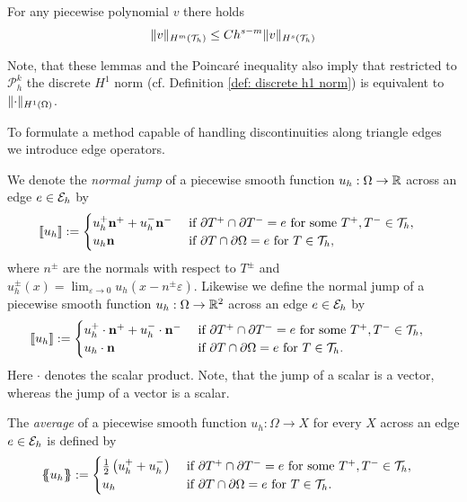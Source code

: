 \begin{definition} 
\begin{lemma}\label{la: inverse estimate}
	For any piecewise polynomial $v$ there holds
	\[
	\lVert v \rVert_{H^m(\mathcal{T}_h)} \leq C h^{s-m} \lVert v \rVert_{H^s(\mathcal{T}_h)}
	\]
\end{lemma}
Note, that these lemmas and the Poincar\'e inequality also imply that restricted to $\mathcal P^k_h$ the discrete $H^1$ norm (cf. Definition \ref{def: discrete h1 norm}) is equivalent to $\lVert \cdot \rVert_{H^1(\Omega)}$.

To formulate a method capable of handling discontinuities along triangle edges we introduce edge operators.   

\begin{definition} \label{def: edge operators}
We denote the \emph{normal jump} of  a piecewise smooth function $u_h:\Omega \rightarrow \mathbb{R}$ across an edge $e \in \mathcal{E}_h$ by
\begin{align*}
	\llbracket u_h \rrbracket&:= 
	\begin{cases}
		u_h^+  \mathbf n^+ + u_h^- \mathbf n^-  &\text{ if } \partial T^+ \cap \partial T^- = e \text{ for some }T^+,T^- \in \mathcal{T}_h, \\
		u_h \mathbf n 	 &\text{ if } \partial T \cap \partial \Omega = e \text{ for } T \in \mathcal{T}_h,
	\end{cases}	
\end{align*}
where $n^\pm$ are the normals with respect to $T^\pm$ and  $u_h^\pm(x) = \lim_{\varepsilon \rightarrow 0} u_h(x-n^\pm \varepsilon)$.
Likewise we define the normal jump of a piecewise smooth function $u_h:\Omega \rightarrow \mathbb{R}^2$ across an edge $e \in \mathcal{E}_h$ by
\begin{align*}
	\llbracket u_h \rrbracket&:= 
	\begin{cases}
		u_h^+ \cdot \mathbf n^+ + u_h^-\cdot  \mathbf n^-  &\text{ if } \partial T^+ \cap \partial T^- = e \text{ for some }T^+,T^- \in \mathcal{T}_h,\\
		u_h\cdot \mathbf n 	 &\text{ if } \partial T \cap \partial \Omega = e \text{ for }T\in \mathcal{T}_h.
	\end{cases}	
\end{align*}
Here $\cdot$ denotes the scalar product.
Note, that the jump of a scalar is a vector, whereas the jump of a vector is a scalar.

The \emph{average} of a piecewise smooth function $u_h:\Omega \rightarrow X$ for every $X$ across an edge $e \in \mathcal{E}_h$ is defined by
\begin{align*}
	\{\!\!\{ u_h \}\!\!\} &:= 
	\begin{cases}
	\frac 1 2 \left(u_h^+ + u_h^-\right) &\text{ if } \partial T^+ \cap \partial T^- = e \text{ for some }T^+,T^- \in \mathcal{T}_h, \\
	 u_h &\text{ if } \partial T \cap \partial \Omega = e \text{ for }T\in \mathcal{T}_h.
	\end{cases}
\end{align*}
\end{definition}


\end{definition}
